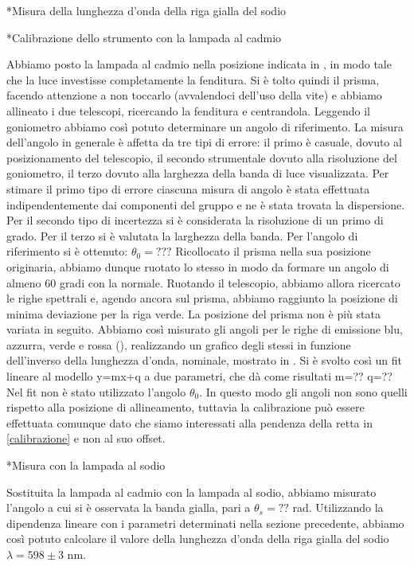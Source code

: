 \begin{section}*{Misura della lunghezza d'onda della riga gialla del sodio}

\begin{subsection}*{Calibrazione dello strumento con la lampada al cadmio}

Abbiamo posto la lampada al cadmio nella posizione indicata in , in modo tale che la luce investisse completamente la fenditura. Si è tolto quindi il prisma, facendo attenzione a non toccarlo (avvalendoci dell'uso della vite) e abbiamo allineato i due telescopi, ricercando la fenditura e centrandola. Leggendo il goniometro abbiamo così potuto determinare un angolo di riferimento. La misura dell'angolo in generale è affetta da tre tipi di errore: il primo è casuale, dovuto al posizionamento del telescopio, il secondo strumentale dovuto alla  risoluzione del goniometro, il terzo dovuto alla larghezza della banda di luce visualizzata.
Per stimare il primo tipo di errore ciascuna misura di angolo è stata effettuata indipendentemente dai componenti del gruppo e ne è stata trovata la dispersione. Per il secondo tipo di incertezza si è considerata la risoluzione di un primo di grado. Per il terzo si è valutata la larghezza della banda. Per l'angolo di riferimento si è ottenuto: $\theta_{0}=??? $ 
Ricollocato il prisma nella sua posizione originaria, abbiamo dunque ruotato lo stesso in modo da formare un angolo di almeno 60 gradi con la normale. Ruotando il telescopio, abbiamo allora ricercato le righe spettrali e, agendo ancora sul prisma, abbiamo raggiunto la posizione di minima deviazione per la riga verde. La posizione del prisma non è più stata variata in seguito. Abbiamo così misurato gli angoli per le righe di emissione blu, azzurra, verde e rossa (), realizzando un grafico degli stessi in funzione dell'inverso della lunghezza d'onda, nominale, mostrato in . Si è svolto così un fit lineare al modello y=mx+q a due parametri, che dà come risultati m=?? q=?? \\ %
Nel fit non è stato utilizzato l'angolo $\theta_{0}$. In questo modo gli angoli non sono quelli rispetto alla posizione di allineamento, tuttavia la calibrazione può essere effettuata comunque dato che siamo interessati alla pendenza della retta in \ref{calibrazione} e non al suo offset.


\end{subsection}

\begin{subsection}*{Misura con la lampada al sodio}

Sostituita la lampada al cadmio con la lampada al sodio, abbiamo misurato l'angolo a cui si è osservata la banda gialla, pari a $\theta_{s} = ??$ rad. Utilizzando la dipendenza lineare con i parametri determinati nella sezione precedente, abbiamo così potuto calcolare il valore della lunghezza d'onda della riga gialla del sodio $\lambda = 598 \pm 3$ nm.

\end{subsection}

\end{section}


